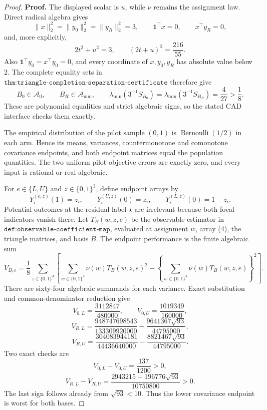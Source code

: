 \documentclass{article}
\begin{document}
\begin{proof}
\textbf{Proof.}
The displayed scalar is \(u\), while \(\nu\) remains the assignment law.  Direct radical algebra gives
\[
\lVert x\rVert_2^2=\lVert y_0\rVert_2^2=\lVert y_R\rVert_2^2=3,
\qquad
\mathbf1^{\top}x=0,
\qquad
x^{\top}y_R=0,
\tag{1}
\]
and, more explicitly,
\[
2t^2+u^2=3,
\qquad
(2t+u)^2=\frac{216}{55}.
\tag{2}
\]
Also \(\mathbf1^{\top}y_0=x^{\top}y_0=0\), and every coordinate of \(x,y_0,y_R\) has absolute value below \(2\).  The complete equality sets in \(\texttt{thm:triangle-completion-separation-certificate}\) therefore give
\[
B_0\in\mathcal A_0,
\qquad
B_R\in\mathcal A_{\mathrm{mm}},
\qquad
\lambda_{\min}(3^{-1}S_{B_0})
=\lambda_{\min}(3^{-1}S_{B_R})=\frac4{27}>\frac18.
\tag{3}
\]
These are polynomial equalities and strict algebraic signs, so the stated CAD interface checks them exactly.

The empirical distribution of the pilot sample \((0,1)\) is \(\operatorname{Bernoulli}(1/2)\) in each arm.  Hence its means, variances, countermonotone and comonotone covariance endpoints, and both endpoint matrices equal the population quantities.  The two uniform pilot-objective errors are exactly zero, and every input is rational or real algebraic.

For \(e\in\{L,U\}\) and \(z\in\{0,1\}^3\), define endpoint arrays by
\[
Y_i^{(e,z)}(1)=z_i,
\qquad
Y_i^{(U,z)}(0)=z_i,
\qquad
Y_i^{(L,z)}(0)=1-z_i.
\tag{4}
\]
Potential outcomes at the residual label \(\star\) are irrelevant because both focal indicators vanish there.  Let \(T_B(w,z,e)\) be the observable estimator in \(\texttt{def:observable-coefficient-map}\), evaluated at assignment \(w\), array (4), the triangle matrices, and basis \(B\).  The endpoint performance is the finite algebraic sum
\[
V_{B,e}=\frac18\sum_{z\in\{0,1\}^3}
\left[
\sum_{w\in\{0,1\}^3}\nu(w)T_B(w,z,e)^2
-\left\{\sum_{w\in\{0,1\}^3}\nu(w)T_B(w,z,e)\right\}^2
\right].
\tag{5}
\]
There are sixty-four algebraic summands for each variance.  Exact substitution and common-denominator reduction give
\[
V_{0,L}=\frac{3112847}{480000},
\qquad
V_{0,U}=\frac{1019349}{160000},
\tag{6}
\]
\[
V_{R,L}=\frac{948747698543}{133309920000}
-\frac{9641367\sqrt{93}}{44795000},
\tag{7}
\]
\[
V_{R,U}=\frac{304083944181}{44436640000}
-\frac{8821467\sqrt{93}}{44795000}.
\tag{8}
\]
Two exact checks are
\[
V_{0,L}-V_{0,U}=\frac{137}{1200}>0,
\tag{9}
\]
\[
V_{R,L}-V_{R,U}
=\frac{2943215-196776\sqrt{93}}{10750800}>0.
\tag{10}
\]
The last sign follows already from \(\sqrt{93}<10\).  Thus the lower covariance endpoint is worst for both bases.


\end{proof}
\end{document}
